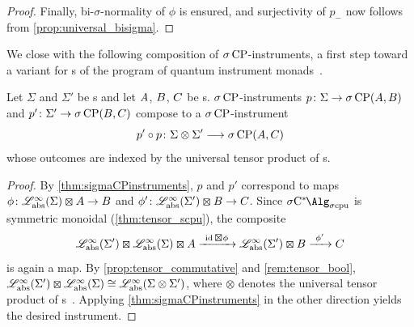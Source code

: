 \begin{proof}
	Finally, bi-$\sigma$-normality of $\phi$ is ensured, and surjectivity of $p_{-}$ now follows from \cref{prop:universal_bisigma}.
\end{proof}

We close with the following composition of $\sigma\operatorname{CP}$-instruments,
a first step toward a variant for \cstars{}s of the program of quantum
instrument monads~\cite{booth2026quantuminstruments,fritz2026quantuminstrumentmonad}.

\begin{proposition}\label{prop:instrument_composition}
		Let $\Sigma$ and $\Sigma'$ be \bsigma{}s and let ${A}$, ${B}$, ${C}$ be \cstars{}s.
		$\sigma\operatorname{CP}$-instruments $p\colon \Sigma \to \sigma\operatorname{CP}({A},{B})$ and $p'\colon \Sigma' \to \sigma\operatorname{CP}({B},{C})$ compose to a $\sigma\operatorname{CP}$-instrument
		\[
			p' \circ p \colon \Sigma \otimes \Sigma' \longrightarrow \sigma\operatorname{CP}({A},{C})
		\]
		whose outcomes are indexed by the universal tensor product of \bsigma{}s.
\end{proposition}
\begin{proof}
		By \cref{thm:sigmaCPinstruments}, $p$ and $p'$ correspond to \scpu{} maps $\phi\colon \Linfbool(\Sigma)\kocktensor \A \to \B$ and $\phi'\colon \Linfbool(\Sigma')\kocktensor \B \to \C$.
		Since $\SigmaCcpu$ is symmetric monoidal (\cref{thm:tensor_scpu}), the composite
		\[
			\Linfbool(\Sigma')\kocktensor \Linfbool(\Sigma)\kocktensor \A
			\xrightarrow{\ \id \kocktensor \phi\ }
			\Linfbool(\Sigma')\kocktensor \B
			\xrightarrow{\ \phi'\ }
			\C
		\]
		is again a \scpu{} map.
		By \cref{prop:tensor_commutative} and \cref{rem:tensor_bool}, $\Linfbool(\Sigma')\kocktensor \Linfbool(\Sigma)\cong \Linfbool(\Sigma\otimes \Sigma')$, where $\otimes$ denotes the universal tensor product of \bsigma{}s~\cite[Proposition 2.5.1]{fritz2025categories}.
		Applying \cref{thm:sigmaCPinstruments} in the other direction yields the desired instrument.
\end{proof}




